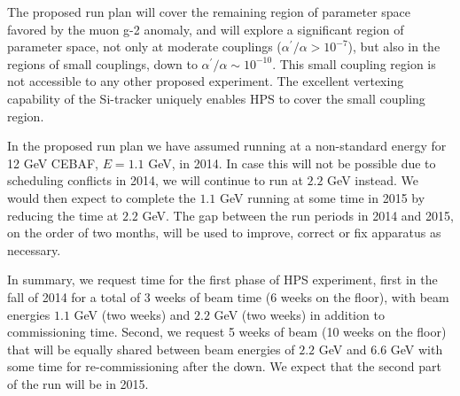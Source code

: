 The proposed run plan will cover the remaining region of parameter space favored by the muon \mbox{g-2} anomaly, and will explore a significant 
region of parameter space, not only at moderate couplings ($\alpha^\prime/\alpha>10^{-7}$), but also in the regions of small couplings, down 
to $\alpha^\prime/\alpha\sim 10^{-10}$. This small coupling region is not accessible to any other proposed experiment. 
The excellent vertexing capability of the Si-tracker uniquely enables HPS to cover the small coupling region. 

In the proposed run plan we have assumed running at a non-standard energy for 12 GeV CEBAF, $E=1.1$ GeV, in 2014. In case this will 
not be possible due to scheduling conflicts in 2014, we will continue to run at $2.2$ GeV instead. We would then expect to complete the $1.1$ 
GeV running at some time in 2015 by reducing the time at $2.2$ GeV. The gap between the run periods in 2014 
and 2015, on the order of two months, will be used to improve, correct or fix apparatus as necessary.

In summary, we request time for the first phase of HPS experiment, first in the fall of 2014 for a 
total of 3 weeks of beam time (6 weeks on the floor), with beam energies $1.1$ GeV (two weeks) and $2.2$ GeV (two weeks) in addition
to commissioning time. 
Second, we request 5 weeks of beam (10 weeks on the floor) that will be equally shared between beam energies 
of $2.2$ GeV and $6.6$ GeV with some time for re-commissioning after the down. We expect that the second part of the run will be in 2015.   

